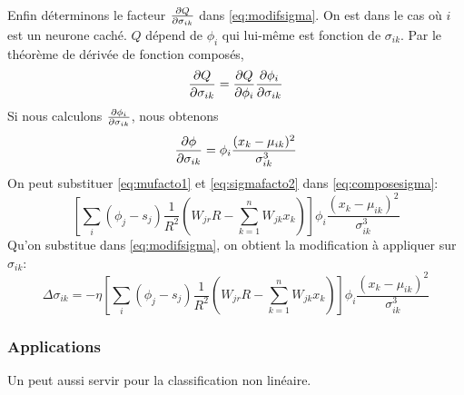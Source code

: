 Enfin déterminons le facteur $\frac{\partial Q}{\partial \sigma_{ik}}$ dans \eqref{eq:modifsigma}. On est dans le cas où $i$ est un neurone caché.
$Q$ dépend de $\phi_i$ qui lui-même est fonction de $\sigma_{ik}$. Par le théorème de dérivée de fonction composés,
\begin{equation}\label{eq:composesigma}
 \frac{\partial Q}{\partial \sigma_{ik}} = \frac{\partial Q}{\partial \phi_i} \frac{\partial \phi_i}{\partial \sigma_{ik}}
\end{equation}
Si nous calculons $\frac{\partial \phi_i}{\partial \sigma_{ik}}$, nous obtenons
\begin{equation}\label{eq:sigmafacto2}
 \frac{\partial \phi}{\partial \sigma_{ik}} = \phi_i \frac{(x_k-\mu_{ik})^2}{\sigma_{ik}^3}
\end{equation}
On peut substituer \eqref{eq:mufacto1} et \eqref{eq:sigmafacto2} dans \eqref{eq:composesigma}:
\[\left[\sum_{i}(\phi_j - s_j) \frac{1}{R^2} \left(W_{jr}R - \sum_{k=1}^{n}W_{jk}x_k\right)\right] \phi_i \frac{(x_k-\mu_{ik})^2}{\sigma_{ik}^3}\]
Qu'on substitue dans \eqref{eq:modifsigma}, on obtient la modification à appliquer sur $\sigma_{ik}$:
\[\Delta \sigma_{ik} = -\eta \left[\sum_{i}(\phi_j - s_j) \frac{1}{R^2} \left(W_{jr}R - \sum_{k=1}^{n}W_{jk}x_k\right)\right] \phi_i \frac{(x_k-\mu_{ik})^2}{\sigma_{ik}^3}\]

\subsubsection{Applications}
Un \rbf peut aussi servir pour la classification non linéaire.\cite{statistica}